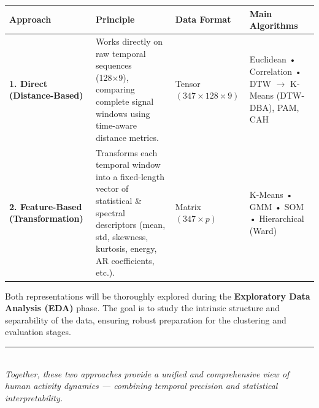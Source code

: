 \documentclass[12pt,a4paper]{report}
\begin{document}
\vspace{0.5cm}
\begin{center}
\begin{tabular}{ p{} p{} p{} p{} } 
\toprule
\textbf{Approach} & \textbf{Principle} & \textbf{Data Format} & \textbf{Main Algorithms} \\ 
\midrule

\textbf{1. Direct (Distance-Based)} &
Works directly on raw temporal sequences (128×9), comparing complete signal windows using time-aware distance metrics. &
Tensor $(347 \times 128 \times 9)$ &
Euclidean • Correlation • DTW $\rightarrow$ K-Means (DTW-DBA), PAM, CAH \\

\addlinespace[4pt]

\textbf{2. Feature-Based (Transformation)} &
Transforms each temporal window into a fixed-length vector of statistical \& spectral descriptors
(mean, std, skewness, kurtosis, energy, AR coefficients, etc.). &
Matrix $(347 \times p)$ &
K-Means • GMM • SOM • Hierarchical (Ward) \\

\bottomrule
\end{tabular}
\end{center}

\vspace{0.6cm}
Both representations will be thoroughly explored during the \textbf{Exploratory Data Analysis (EDA)} phase.
The goal is to study the intrinsic structure and separability of the data,
ensuring robust preparation for the clustering and evaluation stages.

\vspace{0.5cm}
\begin{center}
\rule{0.75\textwidth}{0.4pt}\\
\textit{Together, these two approaches provide a unified and comprehensive view of human activity dynamics — 
combining temporal precision and statistical interpretability.}
\end{center}














\end{document}
